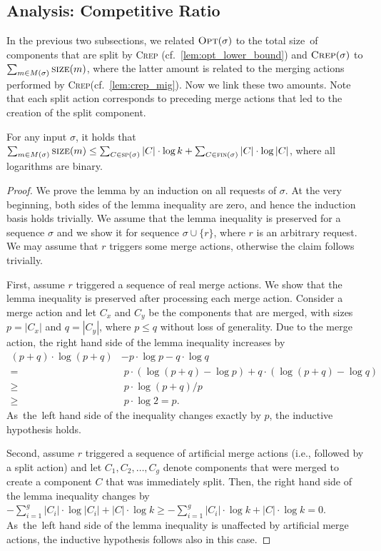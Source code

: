 \documentclass{siamart190516}
\newcommand{\OPT}{\textsc{Opt}\xspace}
\newcommand{\CREP}{\textsc{Crep}\xspace}
\newcommand{\spl}{\textsc{sp}}
\newcommand{\final}{\textsc{fin}}
\newcommand{\size}{\textsc{size}}
\begin{document}
\subsection{Analysis: Competitive Ratio}
\label{sec:crep_ratio}

In the previous two subsections, we related $\OPT(\sigma)$ to the total
size~of components that are split by \CREP
(cf.~\cref{lem:opt_lower_bound}) and $\CREP(\sigma)$ to $\sum_{m \in
M(\sigma)} \size(m)$, where the latter amount is related to the merging
actions performed by \CREP (cf.~\cref{lem:crep_mig}). Now we link
these two amounts. Note that each split action corresponds to preceding
merge actions that led to the creation of the split component.

\begin{lemma}
\label{lem:bounding_merges}
For any input $\sigma$, it holds that 
$\sum_{m \in M(\sigma)} \size(m) 
	\leq \sum_{C \in \spl(\sigma)} |C| \cdot \log k +
	\sum_{C \in \final(\sigma)} |C| \cdot \log |C|$,
where all logarithms are binary.
\end{lemma}

\begin{proof}
We prove the lemma by an induction on all requests of $\sigma$. At the very
beginning, both sides of the lemma inequality are zero, and hence the induction
basis holds trivially. We assume that the lemma inequality is preserved for a
sequence $\sigma$ and we show it for sequence $\sigma \cup \{ r \}$, where $r$
is an arbitrary request. We may assume that $r$ triggers some merge actions,
otherwise the claim follows trivially.

First, assume $r$ triggered a sequence of real merge actions. We show that the
lemma inequality is preserved after processing each merge action. Consider a
merge action and let $C_x$ and $C_y$ be the components that are merged, with
sizes $p = |C_x|$ and $q = |C_y|$, where $p \leq q$ without loss of generality.
Due to the merge action, the right hand side of the lemma inequality increases
by
\begin{align*}
  (p + q) \cdot \log (p + q) & - p \cdot \log p - q \cdot \log q \\
		= &\; p \cdot (\log (p+q) - \log p) + q \cdot (\log (p+q) - \log q) \\
		\geq &\; p \cdot \log (p+q) / p \\
		\geq &\; p \cdot \log 2 = p.
\end{align*}
As~the~left hand side of the inequality changes exactly by $p$, the inductive
hypothesis holds.

Second, assume $r$ triggered a sequence of artificial merge actions (i.e., followed by a
split action) and let $C_1, C_2, \ldots, C_g$ denote components that were
merged to create a component $C$ that was immediately split. Then, the right
hand side of the lemma inequality changes by $- \sum_{i = 1}^g |C_i| \cdot
\log |C_i| + |C| \cdot \log k
\geq - \sum_{i = 1}^g |C_i| \cdot \log k + |C| \cdot \log k = 0$.
As~the~left hand side of the lemma inequality is unaffected by artificial
merge actions, the inductive hypothesis follows also in this case.
\end{proof}
\end{document}
